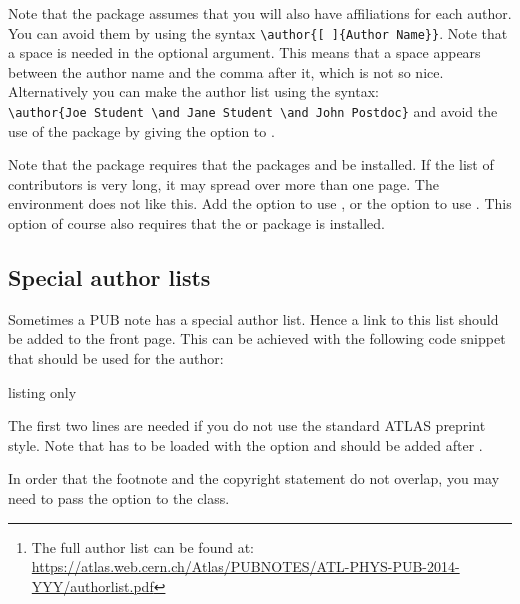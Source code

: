 Note that the  package assumes that you will also have affiliations for each author.
You can avoid them by using the syntax \verb|\author{[ ]{Author Name}}|.
Note that a space is needed in the optional argument.
This means that a space appears between the author name and the comma after it, which is not so nice.
Alternatively you can make the author list using the syntax:\\
\verb|\author{Joe Student \and Jane Student \and John Postdoc}| and avoid the use of the
 package by giving the option  to .

Note that the  package requires that the packages 
 and  be installed.
If the list of contributors is very long, it may spread over more than one page.
The  environment does not like this.
Add the option  to use ,
or the option  to use .
This option of course also requires that the  or  package is installed.


\subsection{Special author lists}

Sometimes a PUB note has a special author list.
Hence a link to this list should be added to the front page.
This can be achieved with the following code snippet that should be used for the author:
\begin{tcblisting}{listing only}
\usepackage{authblk}
\author{The ATLAS Collaboration%
\thanks{The full author list can be found at:\\
  \url{https://atlas.web.cern.ch/Atlas/PUBNOTES/ATL-PHYS-PUB-2014-YYY/authorlist.pdf}}
}
\end{tcblisting}

 The first two lines are needed if you do not use the standard ATLAS preprint style.
Note that  has to be loaded with the option 
and  should be added after \verb||.

 In order that the footnote and the copyright statement do not overlap,
you may need to pass the option  to the  class.


